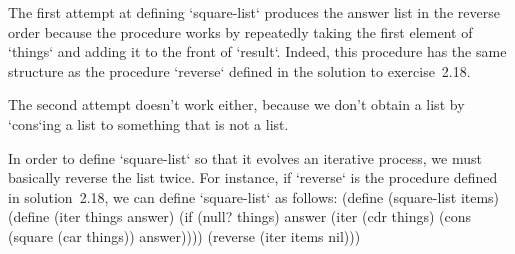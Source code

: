 The first attempt at defining `square-list` produces the answer list in the reverse order because the procedure works by repeatedly taking the first element of `things` and adding it to the front of `result`.  Indeed, this procedure has the same structure as the procedure `reverse` defined in the solution to exercise~2.18.

The second attempt doesn't work either, because we don't obtain a list by `cons`ing a list to something that is not a list. 

In order to define `square-list` so that it evolves an iterative process, we must basically reverse the list twice. For instance, if `reverse` is the procedure defined in solution~2.18, we can define `square-list` as follows: 
\begtt\scm
(define (square-list items)
  (define (iter things answer)
    (if (null? things)
      answer
      (iter (cdr things)
            (cons (square (car things))
                  answer))))
  (reverse (iter items nil)))
\endtt

